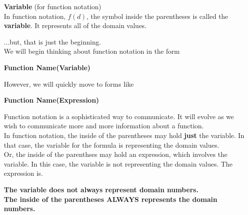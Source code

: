 \documentclass{ximera}
\begin{document}
\begin{definition}  \textbf{\textcolor{green!50!black}{Variable}} (for function notation) \\ 


In function notation, $f(d)$, the symbol inside the parentheses is called the \textbf{variable}. It represents all of the domain values.

\end{definition}



...but, that is just the beginning. \\









We will begin thinking about function notation in the form 

\begin{center}

\textbf{\textcolor{blue!55!black}{Function Name(Variable)}}

\end{center}


However, we will quickly move to forms like


\begin{center}

\textbf{\textcolor{blue!55!black}{Function Name(Expression)}}

\end{center}




Function notation is a sophisticated way to communicate.  It will evolve as we wish to communicate more and more information about a function. \\

In function notation, the inside of the parentheses may hold \textbf{just} the variable.  In that case, the variable for the formula is representing the domain values. \\

Or, the inside of the parenthses may hold an expression, which involves the variable.  In this case, the variable is not representing the domain values. The expression is.\\


 
\begin{center}

\textbf{\textcolor{blue!55!black}{The variable does not always represent domain numbers.}} \\

\textbf{\textcolor{purple!85!blue}{The inside of the parentheses ALWAYS represents the domain numbers.}}


\end{center}
\end{document}
